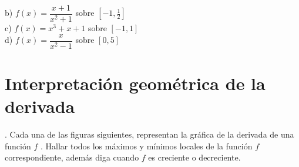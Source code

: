 \documentclass[letterpaper]{article}
\begin{document}
b) $ f(x) = \dfrac{x+1}{x^{2}+1}$ sobre $ [-1,\frac{1}{2}] $\\


c) $ f(x) = x^{3} +x +1$ sobre $ [-1,1] $\\


d) $ f(x) = \dfrac{x}{x^{2} - 1}$ sobre $ [0,5] $\\


\section*{Interpretación geométrica de la derivada}

. Cada una de las figuras siguientes, representan la gráfica de la derivada de una función $ f $ . Hallar todos los máximos y mínimos locales de la función $ f $ correspondiente, además diga cuando $ f $ es creciente o decreciente.\\
\end{document}
